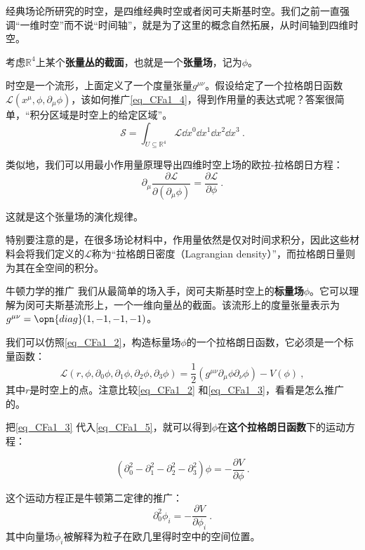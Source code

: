经典场论所研究的时空，是四维经典时空或者闵可夫斯基时空。我们之前一直强调“一维时空”而不说“时间轴”，就是为了这里的概念自然拓展，从时间轴到四维时空。



考虑$\mathbb{R}^4$上某个\textbf{张量丛的截面}，也就是一个\textbf{张量场}，记为$\phi$。

时空是一个流形，上面定义了一个度量张量$g^{\mu\nu}$。假设给定了一个拉格朗日函数$\mathcal{L}(x^\mu, \phi, \partial_\mu\phi)$，该如何推广\autoref{eq_CFa1_4}，得到作用量的表达式呢？答案很简单，“积分区域是时空上的给定区域”。
\begin{equation}
\mathcal{S} = \int_{U\subseteq \mathbb{R}^4} \mathcal{L}\dd x^0\dd x^1\dd x^2\dd x^3~.
\end{equation}

类似地，我们可以用最小作用量原理导出四维时空上场的欧拉-拉格朗日方程：
\begin{equation}\label{eq_CFa1_5}
\partial_\mu \frac{\partial\mathcal{L}}{\partial(\partial_\mu \phi)} = \frac{\partial\mathcal{L}}{\partial \phi}~.
\end{equation}

这就是这个张量场的演化规律。

特别要注意的是，在很多场论材料中，作用量依然是仅对时间求积分，因此这些材料会将我们定义的$\mathcal{L}$称为“拉格朗日密度（Lagrangian density）”，而拉格朗日量则为其在全空间的积分。

\begin{example}{牛顿力学的推广}\label{ex_CFa1_1}
我们从最简单的场入手，闵可夫斯基时空上的\textbf{标量场}$\phi$。它可以理解为闵可夫斯基流形上，一个一维向量丛的截面。该流形上的度量张量表示为$g^{\mu\nu}=\opn{diag}(1, -1, -1, -1)$。

我们可以仿照\autoref{eq_CFa1_2}，构造标量场$\phi$的一个拉格朗日函数，它必须是一个标量函数：
\begin{equation}\label{eq_CFa1_3}
\mathcal{L}(r, \phi, \partial_0\phi, \partial_1\phi, \partial_2\phi, \partial_3\phi) = \frac{1}{2}(g^{\mu\nu}\partial_\mu\phi \partial_\nu\phi) - V(\phi)~,
\end{equation}
其中$r$是时空上的点。注意比较\autoref{eq_CFa1_2} 和\autoref{eq_CFa1_3}，看看是怎么推广的。

把\autoref{eq_CFa1_3} 代入\autoref{eq_CFa1_5}，就可以得到$\phi$在\textbf{这个拉格朗日函数}下的运动方程：

\begin{equation}
(\partial^2_0-\partial^2_1-\partial^2_2-\partial^2_3)\phi = -\frac{\partial V}{\partial \phi}~.
\end{equation}

这个运动方程正是牛顿第二定律的推广：
\begin{equation}
\partial^2_0 \phi_i = -\frac{\partial V}{\partial \phi_i}~.
\end{equation}
其中向量场$\phi_i$被解释为粒子在欧几里得时空中的空间位置。

\end{example}




